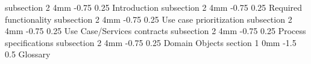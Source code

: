 \documentclass[12pt]{article}
\makeatletter
\renewcommand{\section}{\@startsection
   {section}%
   {1}%
   {0mm}%
   {-1.5\baselineskip}%
   {0.5\baselineskip}%
   {\sffamily\bfseries\upshape\normalsize}}%
\renewcommand{\subsection}{\@startsection
   {subsection}%
   {2}%
   {4mm}%
   {-0.75\baselineskip}%
   {0.25\baselineskip}%
   {\rmfamily\normalfont\scshape\normalsize}}%
\makeatother
\begin{document}
                    \subsection{Introduction}
                    \subsection{Required functionality}
                    \subsection{Use case prioritization}
                    \subsection{Use Case/Services contracts}
                    \subsection{Process specifications}
                    \subsection{Domain Objects}
               \section{Glossary}
             
\end{document}
